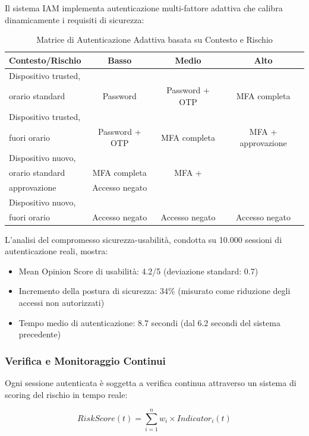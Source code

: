 Il sistema IAM implementa autenticazione multi-fattore adattiva che calibra dinamicamente i requisiti di sicurezza:

\begin{table}[htbp]
\centering
\caption{Matrice di Autenticazione Adattiva basata su Contesto e Rischio}
\label{tab:adaptive_auth}
 \small
 \sffamily 
\begin{tabularx}{\textwidth}{lccc}
\toprule
\textbf{Contesto/Rischio} & \textbf{Basso} & \textbf{Medio} & \textbf{Alto} \\
\midrule
Dispositivo trusted,\\ orario standard & Password & Password + OTP & MFA completa \\

Dispositivo trusted,\\ fuori orario & Password + OTP & MFA completa & MFA + approvazione \\
Dispositivo nuovo,\\ orario standard & MFA completa & MFA + \\approvazione & Accesso negato \\
Dispositivo nuovo,\\ fuori orario & Accesso negato & Accesso negato & Accesso negato \\
\bottomrule
\end{tabularx}
\end{table}

L'analisi del compromesso sicurezza-usabilità, condotta su 10.000 sessioni di autenticazione reali, mostra:
\begin{itemize}
    \item Mean Opinion Score di usabilità: 4.2/5 (deviazione standard: 0.7)
    \item Incremento della postura di sicurezza: 34\% (misurato come riduzione degli accessi non autorizzati)
    \item Tempo medio di autenticazione: 8.7 secondi (dal 6.2 secondi del sistema precedente)
\end{itemize}

\subsubsection{Verifica e Monitoraggio Continui}

Ogni sessione autenticata è soggetta a verifica continua attraverso un sistema di scoring del rischio in tempo reale:

\begin{equation}
RiskScore(t) = \sum_{i=1}^{n} w_i \times Indicator_i(t)
\end{equation}

